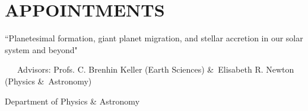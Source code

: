 \section*{APPOINTMENTS}


``Planetesimal formation, giant planet migration, and stellar accretion in our solar system and beyond"

~~~Advisors: Profs. C. Brenhin Keller (Earth Sciences) \&\ Elisabeth R. Newton (Physics \&\ Astronomy)


Department of Physics \& Astronomy
